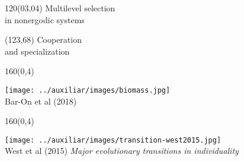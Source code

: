 \documentclass[shownotes,aspectratio=169]{beamer}
\newif\ifen
\newif\ifes
\newcommand{\en}[1]{\ifen#1\fi}
\newcommand{\es}[1]{\ifes#1\fi}
\begin{document}
\color{black!85}
\large

\begin{frame}
 
 \begin{textblock}{120}(03,04)
 \huge \textcolor{black!66}{Multilevel selection \\[-0.1cm] in nonergodic systems}
\end{textblock}

{}

 \begin{textblock}{47}(123,68)
\centering \Large  \textcolor{white!55}{Cooperation \\[-0.2cm] and specialization \hfill }
\end{textblock}

\end{frame}




\begin{frame}[plain]
\begin{textblock}{160}(0,4)
 \centering \LARGE
\en{The complexity of life}
\end{textblock}
\vspace{0.75cm}

\centering
\texttt{[image: ../auxiliar/images/biomass.jpg]}\\[0.2cm]
\footnotesize{Bar-On et al (2018)}

\end{frame}


\begin{frame}[plain]
\begin{textblock}{160}(0,4)
 \centering \LARGE
\en{Major evolutionary transitions}
\end{textblock}
\vspace{0.75cm}

\centering
\texttt{[image: ../auxiliar/images/transition-west2015.jpg]}\\[0.2cm]
\footnotesize{West et al (2015) \emph{Major evolutionary transitions in individuality}}

\end{frame}
\end{document}
